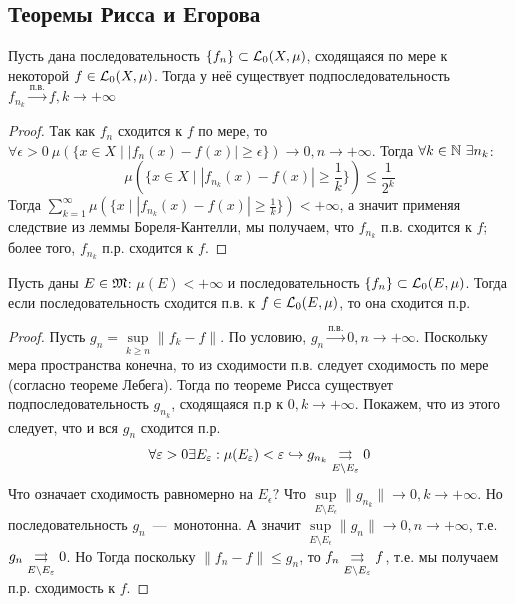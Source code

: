 \subsection{Теоремы Рисса и Егорова}
\begin{theorem}[Рисс]
    Пусть дана последовательность $\{f_n\} \subset \mathcal{L}_0(X, \mu)$, сходящаяся по мере к некоторой $f \in \mathcal{L}_0(X, \mu)$. Тогда у неё существует подпоследовательность $f_{n_k} \xrightarrow{\text{п.в.}} f, k \rightarrow +\infty$
\end{theorem}
\begin{proof}
    Так как $f_n$ сходится к $f$ по мере, то $\forall \epsilon > 0\  \mu(\{x \in X \mid |f_n(x) - f(x)| \geq \epsilon\}) \rightarrow 0, n \rightarrow +\infty$. Тогда $\forall k \in \mathbb{N} \  \exists n_k$: \[\mu\left(\{x \in X \mid |f_{n_k}(x) - f(x)| \geq \frac{1}{k}\}\right) \leq \frac{1}{2^k}\]
    Тогда $\sum\limits_{k = 1}^\infty \mu(\{x \mid |f_{n_k}(x) - f(x)| \geq \frac{1}{k}\}) < +\infty$, а значит применяя следствие из леммы Бореля-Кантелли, мы получаем, что $f_{n_k}$  п.в. сходится к $f$; более того, $f_{n_k}$ п.р. сходится к $f$.
\end{proof}

\begin{theorem}[Егоров]
    Пусть даны $E \in \mathfrak{M}$: $\mu(E) < +\infty$ и последовательность $\{f_n\} \subset \mathcal{L}_0(E, \mu)$. Тогда если последовательность сходится п.в. к $f \in \mathcal{L}_0(E, \mu)$, то она сходится п.р.
\end{theorem}
\begin{proof}
    Пусть $g_n  = \sup\limits_{k \geq n} \|f_k - f\|$. По условию, $g_n \xrightarrow{\text{п.в.}} 0, n \rightarrow +\infty$. Поскольку мера пространства конечна, то из сходимости п.в. следует сходимость по мере (согласно теореме Лебега). Тогда по теореме Рисса существует подпоследовательность $g_{n_k}$, сходящаяся п.р к $0, k \rightarrow +\infty$. Покажем, что из этого следует, что и вся $g_n$ сходится п.р. \[\forall \varepsilon > 0 \exists E_{\varepsilon}: \mu(E_{\varepsilon}) < \varepsilon \hookrightarrow g_{n_k} \underset{E \setminus E_{\varepsilon}}{\rightrightarrows} 0\]
    Что означает сходимость равномерно на $E_\epsilon?$ Что $\sup\limits_{E \setminus E_\epsilon} \|g_{n_k}\| \rightarrow 0, k \rightarrow +\infty$. Но последовательность $g_n$~---~монотонна. А значит $\sup\limits_{E \setminus E_\epsilon} \|g_n\| \rightarrow 0, n \rightarrow +\infty$, т.е. $g_n \underset{E \setminus E_{\varepsilon}}{\rightrightarrows} 0$. Но Тогда поскольку $\|f_n - f\| \leq g_n$, то $f_n \underset{E \setminus E_{\varepsilon}}{\rightrightarrows} f$, т.е. мы получаем п.р. сходимость к $f$.
\end{proof}

